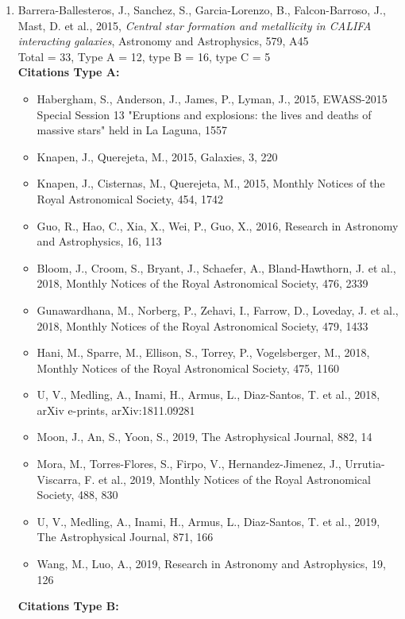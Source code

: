 \documentclass{letter}
\begin{document}
\begin{enumerate}
\begin{itemize}
\end{itemize}
\item Barrera-Ballesteros, J., Sanchez, S., Garcia-Lorenzo, B., Falcon-Barroso, J., Mast, D. et al., 2015, {\it Central star formation and metallicity in CALIFA interacting galaxies}, Astronomy and Astrophysics, 579, A45 \\ 
Total = 33, Type A = 12, type B = 16, type C = 5 \\ 
{\bf Citations Type A:}
\begin{itemize}
\item Habergham, S., Anderson, J., James, P., Lyman, J., 2015, EWASS-2015 Special Session 13 "Eruptions and explosions: the lives and deaths of massive stars" held in La Laguna, 1557
\item Knapen, J., Querejeta, M., 2015, Galaxies, 3, 220
\item Knapen, J., Cisternas, M., Querejeta, M., 2015, Monthly Notices of the Royal Astronomical Society, 454, 1742
\item Guo, R., Hao, C., Xia, X., Wei, P., Guo, X., 2016, Research in Astronomy and Astrophysics, 16, 113
\item Bloom, J., Croom, S., Bryant, J., Schaefer, A., Bland-Hawthorn, J. et al., 2018, Monthly Notices of the Royal Astronomical Society, 476, 2339
\item Gunawardhana, M., Norberg, P., Zehavi, I., Farrow, D., Loveday, J. et al., 2018, Monthly Notices of the Royal Astronomical Society, 479, 1433
\item Hani, M., Sparre, M., Ellison, S., Torrey, P., Vogelsberger, M., 2018, Monthly Notices of the Royal Astronomical Society, 475, 1160
\item U, V., Medling, A., Inami, H., Armus, L., Diaz-Santos, T. et al., 2018, arXiv e-prints, arXiv:1811.09281
\item Moon, J., An, S., Yoon, S., 2019, The Astrophysical Journal, 882, 14
\item Mora, M., Torres-Flores, S., Firpo, V., Hernandez-Jimenez, J., Urrutia-Viscarra, F. et al., 2019, Monthly Notices of the Royal Astronomical Society, 488, 830
\item U, V., Medling, A., Inami, H., Armus, L., Diaz-Santos, T. et al., 2019, The Astrophysical Journal, 871, 166
\item Wang, M., Luo, A., 2019, Research in Astronomy and Astrophysics, 19, 126
\end{itemize}
{\bf Citations Type B:}

\end{enumerate}
\end{document}
